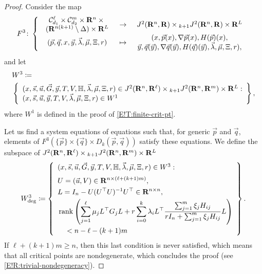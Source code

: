 \begin{proof}
  Consider the map
  \[
    F^3 \colon \left\{
    \begin{array}{ccc}
      \begin{array}{c}
        \mathcal{C}_{d_1}^\ell \times \mathcal{C}_{d_2}^m \times \mathbf{R}^n \times {} \\
        (\mathbf{R}^{n(k + 1)} \setminus \Delta) \times \mathbf{R}^L
      \end{array}
      & \to &
      J^2(\mathbf{R}^n, \mathbf{R}) \times {}_{k + 1} J^2(\mathbf{R}^n, \mathbf{R}) \times \mathbf{R}^L \\
      (\vec{p}, \vec{q}, x, \vec{y}, \vec{\lambda}, \vec{\mu}, \Xi, r)
      & \mapsto &
      \begin{array}{c}
        (x, \vec{p}(x), \nabla \vec{p}(x), H(\vec{p})(x), \\
        \vec{y}, \vec{q}(\vec{y}), \nabla \vec{q}(\vec{y}), H(\vec{q})(\vec{y}), \vec{\lambda}, \vec{\mu}, \Xi, r),
      \end{array}
    \end{array}
    \right.
  \]
  and let
  \begin{align*}
    & W^3 \coloneq \\
    & \left\{
    \begin{array}{l}
      (x, \vec{s}, \vec{u}, \vec{G}, \vec{y}, T, V, \mathbb{H}, \vec{\lambda}, \vec{\mu}, \Xi, r) \in J^2(\mathbf{R}^n, \mathbf{R}^\ell) \times {}_{k + 1} J^2(\mathbf{R}^n, \mathbf{R}^m) \times \mathbf{R}^{L} :
      \\
      (x, \vec{s}, \vec{u}, \vec{y}, T, V, \vec{\lambda}, \vec{\mu}, \Xi, r) \in W^1
    \end{array}
    \right\},
  \end{align*}
  where $W^1$ is defined in the proof of \cref{E!T:finite-crit-pt}.
  
  Let us find a system equations of equations such that, for generic $\vec{p}$ and $\vec{q}$, elements of $F^3(\{\vec{p}\} \times \{\vec{q}\} \times D_k(\vec{p}, \vec{q}))$ satisfy these equations.
  We define the subspace of $J^2(\mathbf{R}^n, \mathbf{R}^\ell) \times {}_{k + 1} J^2(\mathbf{R}^n, \mathbf{R}^m) \times \mathbf{R}^L$
  \[
    W^3_{\textnormal{deg}} \coloneq \left\{
    \begin{array}{l}
      (x, \vec{s}, \vec{u}, \vec{G}, \vec{y}, T, V, \mathbb{H}, \vec{\lambda}, \vec{\mu}, \Xi, r) \in W^3 : \medskip
      \\
      \begin{aligned}
        & U = (\vec{u}, V) \in \R^{n \times (\ell + (k + 1)m)}, \\
        & L = I_n - U (U^\TT U)^{-1} U^\TT \in \R^{n \times n}, \\
        & \rank \left( \sum_{j = 1}^\ell \mu_j L^\TT G_j L + r \sum_{i = 0}^k \lambda_i L^\TT \frac{\sum_{j = 1}^m \xi_j H_{ij}}{r I_n + \sum_{j = 1}^m \xi_j H_{ij}} L \right) \\
        & \quad < n - \ell - (k + 1) m
      \end{aligned}
    \end{array}
    \right\}.
  \]
  If $\ell + (k + 1) m \geq n$, then this last condition is never satisfied, which means that all critical points are nondegenerate, which concludes the proof (see \cref{E!R:trivial-nondegeneracy}).
  

\end{proof}
